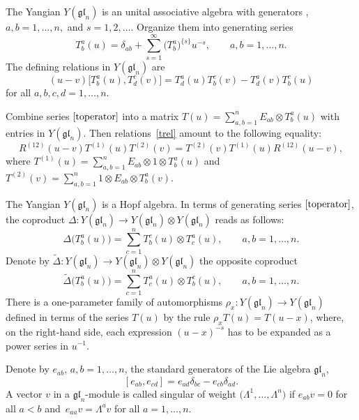 \documentclass[pdftex]{sigma}
\numberwithin{equation}{section}
\begin{document}
The Yangian $Y(\mathfrak{g l}_{n})$ is an unital associative algebra with generators , $a, b=1, \dots, n, $ and $s=1,2, \dots$. Organize them into generating series
\begin{equation}\label{toperator} T^a_b(u)=\delta_{ab}+\sum_{s=1}^{\infty} \bigl(T^a_b\bigr)^{\{s\}} u^{-s}, \qquad a, b=1, \dots, n.\end{equation}
The defining relations in $Y(\mathfrak{g l}_{n})$ are
\begin{equation} (u-v)\bigl[T^a_b(u), T^c_d(v)\bigr]=T^a_d(u)T^c_b(v) -T^a_d(v)T^c_b(u) \label{trel}\end{equation}
for all $a, b, c, d=1, \dots, n$.

Combine series $\eqref{toperator}$ into a matrix $T(u)=\sum_{a, b=1}^{n} E_{a b} \otimes T_{ b}^a(u)$ with entries in $ Y(\mathfrak{g l}_{n})$. Then relations~\eqref{trel} amount to the following equality:
\begin{equation*}
R^{(12)}(u-v) T^{(1)}(u) T^{(2)}(v)=T^{(2)}(v) T^{(1)}(u) R^{(12)}(u-v),
\end{equation*}
where $T^{(1)}(u)=\sum_{a, b=1}^{n} E_{a b}\otimes 1 \otimes T_{ b}^a(u)$ and $T^{(2)}(v)=\sum_{a, b=1}^{n} 1 \otimes E_{a b}\otimes T_{ b}^a(v)$.

The Yangian $Y(\mathfrak{g l}_{n})$ is a Hopf algebra. In terms of generating series $\eqref{toperator}$, the coproduct $\Delta\colon Y(\mathfrak{g l}_{n}) \rightarrow Y(\mathfrak{g l}_{n}) \otimes Y(\mathfrak{g l}_{n})$ reads as follows:
\begin{equation}\label{coproduct}
\Delta\bigl(T_{ b}^a(u)\bigr)=\sum_{c=1}^{n} T^c_{ b}(u) \otimes T^a_{ c}(u), \qquad a, b=1, \dots, n.
\end{equation}
Denote by $\widetilde{\Delta}\colon Y(\mathfrak{g l}_{n}) \rightarrow Y(\mathfrak{g l}_{n}) \otimes Y(\mathfrak{g l}_{n})$ the opposite coproduct
\begin{equation}\label{opcoproduct}
\widetilde{\Delta}\bigl(T_{ b}^a(u)\bigr)=\sum_{c=1}^nT^a_c(u)\otimes T^c_b(u), \qquad a, b=1, \dots, n.
\end{equation}
There is a one-parameter family of automorphisms $\rho_x\colon Y(\mathfrak{gl}_n) \rightarrow Y(\mathfrak{gl}_n)$ defined in terms of the series $T(u)$ by the rule $\rho_x T(u)= T(u-x)$, where, on the right-hand side, each expression $(u-x)^{-s}$ has to be expanded as a power series in $u^{-1}$.

Denote by $e_{ab}$, $a,b=1,\dots,n$, the standard generators of the Lie algebra $\mathfrak{gl}_n$,
\begin{equation}\label{eijkl}
[e_{ab},e_{cd}]=e_{ad} \delta_{bc}-e_{cb} \delta_{ad}.
\end{equation}
A vector $v$ in a $\mathfrak{gl}_n$-module is called
singular of weight $\bigl(\Lambda^1,\dots,\Lambda^n\bigr)$ if $e_{ab}v = 0$ for all $a<b$ and~${e_{aa}v=\Lambda^av}$ for all $a=1,\dots,n$.
\end{document}
